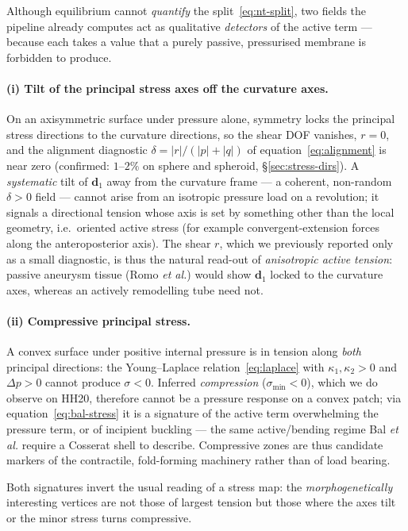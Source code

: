 \documentclass[11pt]{article}
\newcommand{\vv}[1]{\bm{#1}}          %
\begin{document}
Although equilibrium cannot \emph{quantify} the split~\eqref{eq:nt-split}, two
fields the pipeline already computes act as qualitative \emph{detectors} of the
active term --- because each takes a value that a purely passive, pressurised
membrane is forbidden to produce.

\paragraph{(i) Tilt of the principal stress axes off the curvature axes.}
On an axisymmetric surface under pressure alone, symmetry locks the principal
stress directions to the curvature directions, so the shear DOF vanishes,
$r=0$, and the alignment diagnostic
$\delta=|r|/(|p|+|q|)$ of equation~\eqref{eq:alignment} is near zero (confirmed:
$1$--$2\%$ on sphere and spheroid, \S\ref{sec:stress-dirs}).  A \emph{systematic}
tilt of $\vv d_1$ away from the curvature frame --- a coherent, non-random
$\delta>0$ field --- cannot arise from an isotropic pressure load on a
revolution; it signals a directional tension whose axis is set by something other
than the local geometry, i.e.\ oriented active stress (for example
convergent-extension forces along the anteroposterior axis).  The shear $r$,
which we previously reported only as a small diagnostic, is thus the natural
read-out of \emph{anisotropic active tension}: passive aneurysm tissue (Romo
\textit{et al.}) would show $\vv d_1$ locked to the curvature axes, whereas an
actively remodelling tube need not.

\paragraph{(ii) Compressive principal stress.}
A convex surface under positive internal pressure is in tension along
\emph{both} principal directions: the Young--Laplace
relation~\eqref{eq:laplace} with $\kappa_1,\kappa_2>0$ and $\Delta p>0$ cannot
produce $\sigma<0$.  Inferred \emph{compression} ($\sigma_{\min}<0$), which we do
observe on HH20, therefore cannot be a pressure response on a convex patch; via
equation~\eqref{eq:bal-stress} it is a signature of the active term overwhelming
the pressure term, or of incipient buckling --- the same active/bending regime
Bal \textit{et al.} require a Cosserat shell to describe.  Compressive zones are
thus candidate markers of the contractile, fold-forming machinery rather than of
load bearing.

Both signatures invert the usual reading of a stress map: the
\emph{morphogenetically} interesting vertices are not those of largest tension but
those where the axes tilt or the minor stress turns compressive.
\end{document}

